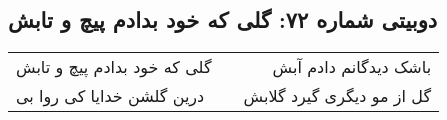 \begin{center}
\section*{دوبیتی شماره ۷۲: گلی که خود بدادم پیچ و تابش}
\label{sec:072}
\begin{longtable}{l p{0.5cm} r}
گلی که خود بدادم پیچ و تابش
&&
باشک دیدگانم دادم آبش
\\
درین گلشن خدایا کی روا بی
&&
گل از مو دیگری گیرد گلابش
\\
\end{longtable}
\end{center}
